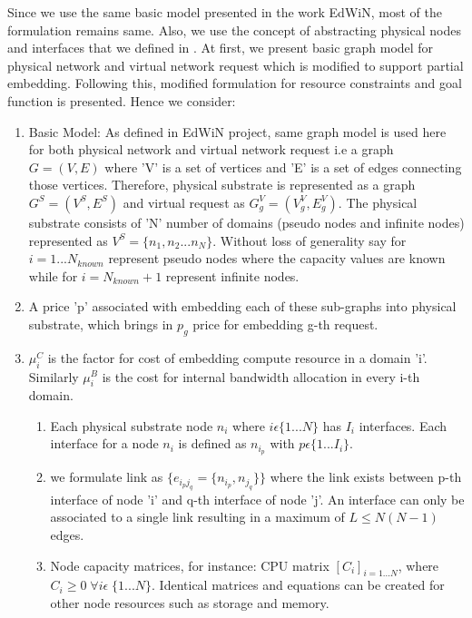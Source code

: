 \documentclass[article,dr=phil,type=msc ,colorback,accentcolor=tud4b]{tudthesis}
\begin{document}
Since we use the same basic model presented in the work EdWiN, most of the formulation remains same. Also, we use the concept of abstracting physical nodes and interfaces that we defined in \cite{7116141}. At first, we present basic graph model for physical network and virtual network request which is modified to support partial embedding. Following this, modified formulation for resource constraints and goal function is presented. Hence we consider:

\begin{enumerate}[label=(\Alph*)]
\item  Basic Model: As defined in EdWiN project, same graph model is used here for both physical network and virtual network request i.e a graph $G= (V, E)$ where 'V' is a set of vertices and 'E' is a set of edges connecting those vertices. Therefore, physical substrate is represented as a graph $G^{S} = (V^{S}, E^{S})$ and virtual request as $G^{V}_{g} = (V^{V}_{g}, E^{V}_{g})$. The physical substrate consists of 'N' number of domains (pseudo nodes and infinite nodes) represented as $V^{S} = \{n_{1},n_{2}...n_{N}\}$. Without loss of generality say for $i = 1...N_{known}$ represent pseudo nodes where the capacity values are known while for $i = N_{known} + 1$ represent infinite nodes. 

\item A price 'p' associated with embedding each of these sub-graphs into physical substrate, which brings in $p_{g}$ price for embedding g-th request.

\item $\mu_{i}^{C}$ is the factor for cost of embedding compute resource in a domain 'i'. Similarly $\mu_{i}^{B}$ is the cost for internal bandwidth allocation in every i-th domain.

\begin{enumerate}
\item Each physical substrate node $n_{i}$ where $i \epsilon \{1...N\}$ has $I_{i}$ interfaces. Each interface for a node $n_{i}$ is defined as $n_{i_{p}}$ with $p \epsilon \{1...I_{i}\}$. 

\item we formulate link as $\{e_{i_{p}j_{q}} = \{ n_{i_{p}}, n_{j_{q}}\}  \}$ where the link exists between p-th interface of node 'i' and q-th interface of node 'j'. An interface can only be associated to a single link resulting in a maximum of $L \leq N(N-1)$ edges. 

\item Node capacity matrices, for instance: CPU matrix $[ C_{i}]_{i = 1...N}$, where $C_{i} \ge 0 \; \forall i\epsilon \; \{1...N\}$. Identical matrices and equations can be created for other node resources such as storage and memory. 


\end{enumerate}
\end{enumerate}
\end{document}
